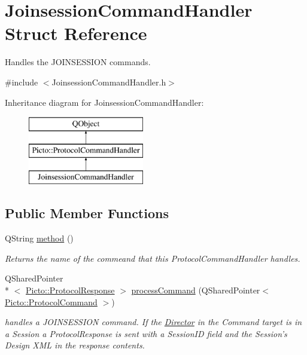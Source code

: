 \hypertarget{struct_joinsession_command_handler}{\section{Joinsession\-Command\-Handler Struct Reference}
\label{struct_joinsession_command_handler}
}


Handles the J\-O\-I\-N\-S\-E\-S\-S\-I\-O\-N commands.  




{\ttfamily \#include $<$Joinsession\-Command\-Handler.\-h$>$}

Inheritance diagram for Joinsession\-Command\-Handler\-:\begin{figure}[H]
\begin{center}
\leavevmode
\includegraphics[height=3.000000cm]{struct_joinsession_command_handler}
\end{center}
\end{figure}
\subsection*{Public Member Functions}
\begin{DoxyCompactItemize}
\item 
\hypertarget{struct_joinsession_command_handler_a6c0c142eb3f18146ffa9f2c617cf9869}{Q\-String \hyperlink{struct_joinsession_command_handler_a6c0c142eb3f18146ffa9f2c617cf9869}{method} ()}\label{struct_joinsession_command_handler_a6c0c142eb3f18146ffa9f2c617cf9869}

\begin{DoxyCompactList}\small\item\em Returns the name of the commeand that this Protocol\-Command\-Handler handles. \end{DoxyCompactList}\item 
\hypertarget{struct_joinsession_command_handler_a805eae13641356ff3d1092e91f9ad346}{Q\-Shared\-Pointer\\*
$<$ \hyperlink{struct_picto_1_1_protocol_response}{Picto\-::\-Protocol\-Response} $>$ \hyperlink{struct_joinsession_command_handler_a805eae13641356ff3d1092e91f9ad346}{process\-Command} (Q\-Shared\-Pointer$<$ \hyperlink{struct_picto_1_1_protocol_command}{Picto\-::\-Protocol\-Command} $>$)}\label{struct_joinsession_command_handler_a805eae13641356ff3d1092e91f9ad346}

\begin{DoxyCompactList}\small\item\em handles a J\-O\-I\-N\-S\-E\-S\-S\-I\-O\-N command. If the \hyperlink{class_director}{Director} in the Command target is in a Session a Protocol\-Response is sent with a Session\-I\-D field and the Session's Design X\-M\-L in the response contents. \end{DoxyCompactList}\end{DoxyCompactItemize}



